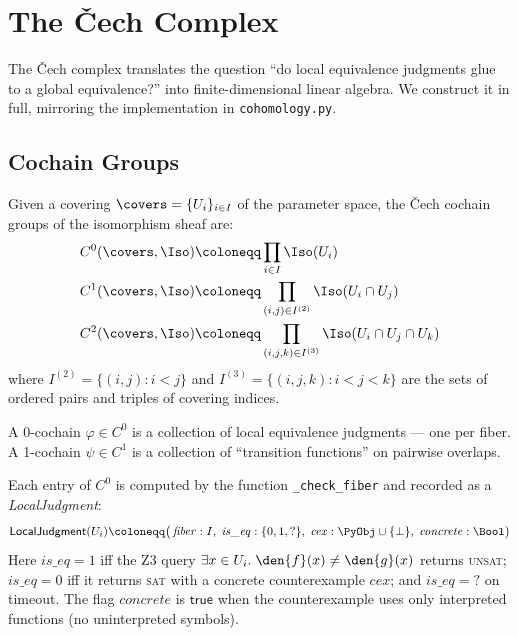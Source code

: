 \chapter{The \v{C}ech Complex}
\label{ch:cech}

The \v{C}ech complex translates the question ``do local equivalence
judgments glue to a global equivalence?'' into finite-dimensional
linear algebra.  We construct it in full, mirroring the implementation
in \texttt{cohomology.py}.

\section{Cochain Groups}

\begin{definition}
\label{def:cech-cochain}
Given a covering $\covers = \{U_i\}_{i \in I}$ of the parameter space,
the \v{C}ech cochain groups of the isomorphism sheaf are:
\begin{align}
  C^0(\covers, \Iso) &\coloneqq \prod_{i \in I} \Iso(U_i) \\
  C^1(\covers, \Iso) &\coloneqq \prod_{(i,j) \in I^{(2)}} \Iso(U_i \cap U_j) \\
  C^2(\covers, \Iso) &\coloneqq \prod_{(i,j,k) \in I^{(3)}}
    \Iso(U_i \cap U_j \cap U_k)
\end{align}
where $I^{(2)} = \{(i,j) : i < j\}$ and
$I^{(3)} = \{(i,j,k) : i < j < k\}$ are the sets of ordered pairs
and triples of covering indices.
\end{definition}

A 0-cochain $\varphi \in C^0$ is a collection of local
equivalence judgments --- one per fiber.  A 1-cochain
$\psi \in C^1$ is a collection of ``transition functions'' on
pairwise overlaps.

\begin{definition}
\label{def:local-judgment}
Each entry of $C^0$ is computed by the function
\texttt{\_check\_fiber} and recorded as a \emph{LocalJudgment}:
\[
  \mathsf{LocalJudgment}(U_i) \coloneqq
  \bigl(\,\mathit{fiber} : I,\;
         \mathit{is\_eq} : \{0, 1, {?}\},\;
         \mathit{cex} : \PyObj \cup \{\bot\},\;
         \mathit{concrete} : \Bool
  \bigr)
\]
Here $\mathit{is\_eq} = 1$ iff the Z3 query
$\exists x \in U_i.\;\den{f}(x) \neq \den{g}(x)$ returns
\textsc{unsat}; $\mathit{is\_eq} = 0$ iff it returns \textsc{sat}
with a concrete counterexample $\mathit{cex}$; and
$\mathit{is\_eq} = {?}$ on timeout.  The flag $\mathit{concrete}$
is $\mathsf{true}$ when the counterexample uses only interpreted
functions (no uninterpreted symbols).
\end{definition}

